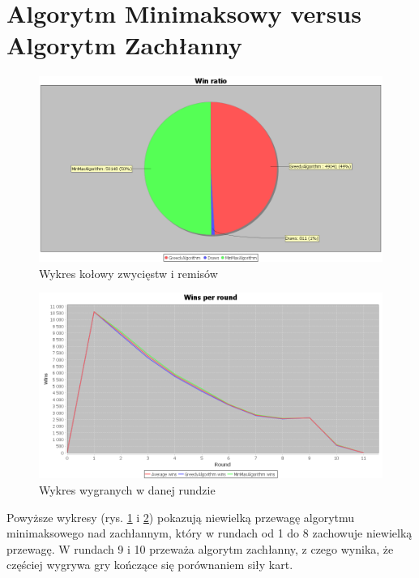 \section{Algorytm Minimaksowy versus Algorytm Zachłanny}
\begin{figure}[H]
	\centering
	\includegraphics[width=\textwidth]{Resources/MirrorMmVsG/GVsMmWin.PNG}
	\caption{Wykres kołowy zwycięstw i remisów} 
	\label{fig:MirrorGVsMmWin}
\end{figure}

\begin{figure}[H]
	\centering
	\includegraphics[width=\textwidth]{Resources/MirrorMmVsG/GVsMmRoundWin.PNG}
	\caption{Wykres wygranych w danej rundzie} 
	\label{fig:MirrorGVsMmRoundWin}
\end{figure}

Powyższe wykresy (rys. \ref{fig:MirrorGVsMmWin} i \ref{fig:MirrorGVsMmRoundWin}) pokazują niewielką przewagę algorytmu minimaksowego nad zachłannym, który w rundach od 1 do 8 zachowuje niewielką przewagę. W rundach 9 i 10 przeważa algorytm zachłanny, z czego wynika, że częściej wygrywa gry kończące się porównaniem siły kart.

